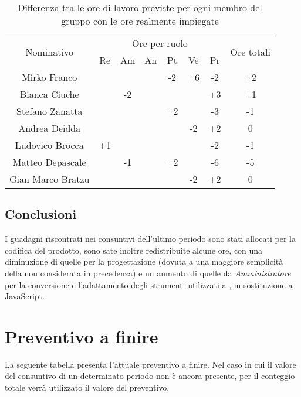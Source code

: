 \begin{flushleft}
\begin{table}[!h]
\begin{center}
\begin{tabularx}{\textwidth}{|c|cccccc|c|}
				\hline
				\multirow{2}{*}{Nominativo} & \multicolumn{6}{c|}{Ore per ruolo} & \multirow{2}{*}{Ore totali} \\ \cline{2-7}
				& Re & Am & An & Pt & Ve & Pr &      \\ \hline
				\endhead
				Mirko Franco       &   &  &   & -2  & +6 & -2  & +2        \\ \hline
				Bianca Ciuche      &   & -2  &   &   &  & +3  & +1        \\ \hline
				Stefano Zanatta    &   &  &   &	 +2 &  &  -3 & -1        \\ \hline
				Andrea Deidda      &   &  &   &   & -2 & +2  & 0  		\\ \hline
				Ludovico Brocca    &  +1 &  &   &   &  & -2  & -1        \\ \hline
				Matteo Depascale   &   & -1&  & +2&  &	-6 & -5  		\\ \hline
				Gian Marco Bratzu  & &  &   &   & -2 & +2  & 0        \\ \hline
				
			\end{tabularx}
			\caption{Differenza tra le ore di lavoro previste per ogni membro del gruppo con le ore realmente impiegate }
		\end{center}
	\end{table}

	\subsection{Conclusioni}
	I guadagni riscontrati nei consuntivi dell'ultimo periodo sono stati allocati per la codifica del prodotto, sono sate inoltre redistribuite alcune ore, con una diminuzione di quelle per la progettazione (dovuta a una maggiore semplicità della  non considerata in precedenza) e un aumento di quelle da \textit{Amministratore} per la conversione e l'adattamento degli strumenti utilizzati a , in sostituzione a JavaScript.\\
	
\section{Preventivo a finire}
	La seguente tabella presenta l’attuale preventivo a finire. Nel caso in cui il
	valore del consuntivo di un determinato periodo non è ancora presente, per
	il conteggio totale verrà utilizzato il valore del preventivo.
	
		\begin{table}[!h]
		\begin{center}
			

\end{center}
\end{table}
\end{flushleft}
